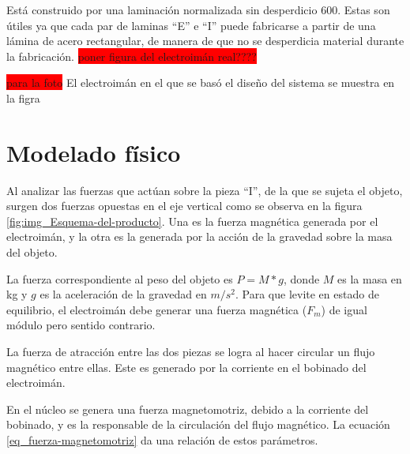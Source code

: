 \noindent Está construido por una laminación normalizada sin desperdicio 600. Estas son útiles ya que cada par de laminas ``E'' e ``I'' puede fabricarse a partir de una lámina de acero rectangular, de manera de que no se desperdicia material durante la fabricación. 
\colorbox{red}{poner figura del electroimán real????}

\noindent \colorbox{red}{para la foto} El electroimán en el que se basó el diseño del sistema se muestra en la figra

\section{Modelado físico}

\noindent Al analizar las fuerzas que actúan sobre la pieza ``I'', de la que se sujeta el objeto, surgen dos fuerzas opuestas en el eje vertical como se observa en la figura \ref{fig:img_Esquema-del-producto}. Una es la fuerza magnética generada por el electroimán, y la otra es la generada por la acción de la gravedad sobre la masa del objeto. 
 

\noindent La fuerza correspondiente al peso del objeto es $P=M*g$, donde $M$ es la masa en kg y $g$ es la aceleración de la gravedad en $m/s^2$. Para que levite en estado de equilibrio, el electroimán debe generar una fuerza magnética ($F_{m}$) de igual módulo pero sentido contrario.

\noindent La fuerza de atracción entre las dos piezas se logra al hacer circular un flujo magnético entre ellas. Este es generado por la corriente en el bobinado del electroimán.

\noindent En el núcleo se genera una fuerza magnetomotriz, debido a la corriente del bobinado, y es la responsable de la circulación del flujo magnético. La ecuación \ref{eq_fuerza-magnetomotriz} da una relación de estos parámetros.	


